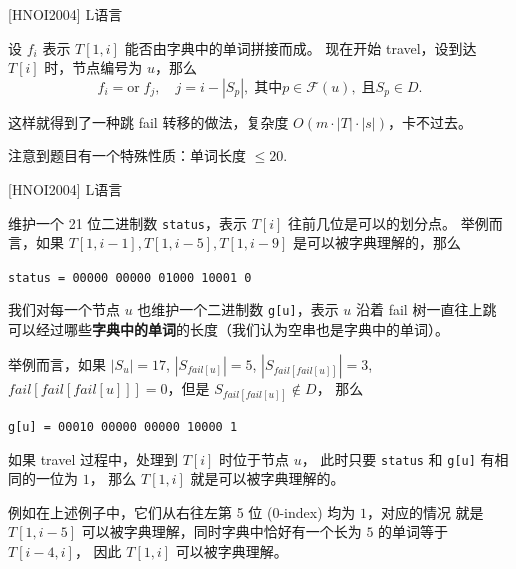 \documentclass{beamer}
\begin{document}
\begin{frame}[fragile]{[HNOI2004] L语言}
    \footnotesize

    设 $f_i$ 表示 $T[1,i]$ 能否由字典中的单词拼接而成。\pause 
    现在开始 travel，设到达 $T[i]$ 时，节点编号为 $u$，那么
    \begin{equation*}
        f_i=\text{or}\; f_j,\quad j=i-|S_p|,\; \text{其中} p\in \mathcal{F}(u),\; \text{且} S_p\in D.
    \end{equation*}

    这样就得到了一种跳 fail 转移的做法，复杂度 $O(m \cdot |T| \cdot |s|)$，卡不过去。

    \vspace{1em}\pause
    注意到题目有一个特殊性质：单词长度 $\leq 20$.
\end{frame}

\begin{frame}[fragile]{[HNOI2004] L语言}
    \footnotesize

    维护一个 21 位二进制数 \verb|status|，表示 $T[i]$ 往前几位是可以的划分点。
    举例而言，如果 $T[1,i-1],T[1,i-5],T[1,i-9]$ 是可以被字典理解的，那么
    
    \verb|status = 00000 00000 01000 10001 0|

    \vspace{1em}\pause
    我们对每一个节点 $u$ 也维护一个二进制数 \verb|g[u]|，表示 $u$ 沿着 fail 树一直往上跳
    可以经过哪些\textbf{字典中的单词}的长度（我们认为空串也是字典中的单词）。

    \vspace{1em}
    举例而言，如果 $|S_u|=17$, $|S_{fail[u]}|=5$, $|S_{fail[fail[u]]}|=3$, 
    $fail[fail[fail[u]]]=0$，但是 $S_{fail[fail[u]]}\notin D$，
    那么

    \verb|g[u] = 00010 00000 00000 10000 1|

    \vspace{1em}\pause
    如果 travel 过程中，处理到 $T[i]$ 时位于节点 $u$，
    此时只要 \verb|status| 和 \verb|g[u]| 有相同的一位为 $1$，
    那么 $T[1,i]$ 就是可以被字典理解的。

    \vspace{1em}\pause
    例如在上述例子中，它们从右往左第 5 位 (0-index) 均为 $1$，对应的情况
    就是 $T[1,i-5]$ 可以被字典理解，同时字典中恰好有一个长为 $5$ 的单词等于 $T[i-4,i]$，
    因此 $T[1,i]$ 可以被字典理解。
\end{frame}
\end{document}

